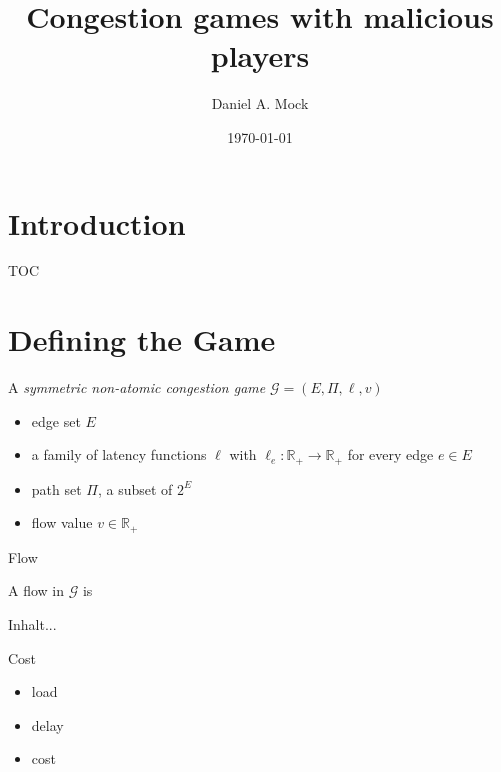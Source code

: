 \documentclass{beamer}
\title{Congestion games with malicious players}
\date{\today}
\author{Daniel A. Mock}
\institute{Lehrstuhl i1 -- RWTH Aachen}
\begin{document}
\maketitle

\section{Introduction}
\begin{frame}{TOC
		}
	\tableofcontents
\end{frame}


\section{Defining the Game}

\begin{frame}{}
	
	\begin{definition}
		A \emph{symmetric non-atomic congestion game} $\mathcal{G} = (E, \Pi, \ell, v)$
	\end{definition}

	\begin{itemize}
		\item edge set $E$
		\item a family of latency functions $\ell$ with 
		 $\ell_e: \mathbb{R}_+ \to \mathbb{R}_+$ for every edge $e \in E$
		\item path set $\Pi$, a subset of $2^E$
		\item flow value $v \in \mathbb{R}_+$
	\end{itemize}
\end{frame}

\begin{frame}{Flow}
	\begin{definition}[Flow]
		A flow in $\mathcal G$ is
	\end{definition}
	
	\begin{definition}
		Inhalt...
	\end{definition}
\end{frame}

\begin{frame}{Cost}
	\begin{itemize}
		\item load
		\item delay
		\item cost
	\end{itemize}
\end{frame}
\end{document}
